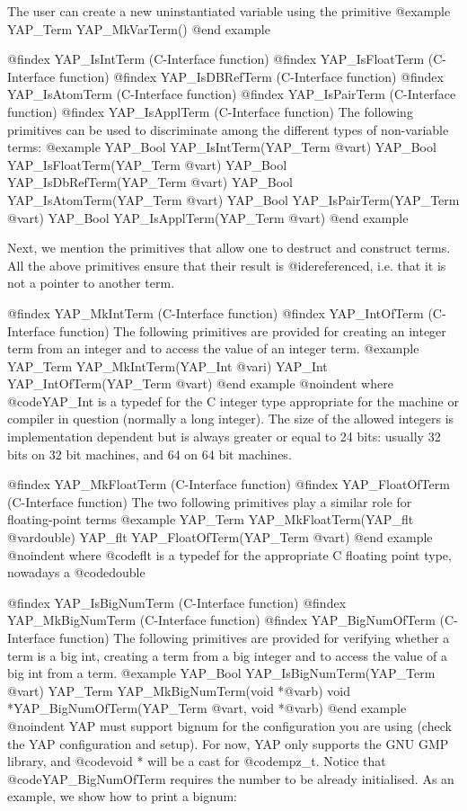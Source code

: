 {{{{{{{{{The user can create a new uninstantiated variable using the primitive
@example
      YAP_Term  YAP_MkVarTerm()
@end example


@findex YAP_IsIntTerm (C-Interface function)
@findex YAP_IsFloatTerm (C-Interface function)
@findex YAP_IsDBRefTerm (C-Interface function)
@findex YAP_IsAtomTerm (C-Interface function)
@findex YAP_IsPairTerm (C-Interface function)
@findex YAP_IsApplTerm (C-Interface function)
The following primitives can be used to discriminate among the different types
of non-variable terms:
@example
      YAP_Bool YAP_IsIntTerm(YAP_Term @var{t})
      YAP_Bool YAP_IsFloatTerm(YAP_Term @var{t})
      YAP_Bool YAP_IsDbRefTerm(YAP_Term @var{t})
      YAP_Bool YAP_IsAtomTerm(YAP_Term @var{t})
      YAP_Bool YAP_IsPairTerm(YAP_Term @var{t})
      YAP_Bool YAP_IsApplTerm(YAP_Term @var{t})
@end example

Next, we mention the primitives that allow one to destruct and construct
terms. All the above primitives ensure that their result is
@i{dereferenced}, i.e. that it is not a pointer to another term.

@findex YAP_MkIntTerm (C-Interface function)
@findex YAP_IntOfTerm (C-Interface function)
The following primitives are provided for creating an integer term from an
integer and to access the value of an integer term.
@example
      YAP_Term YAP_MkIntTerm(YAP_Int  @var{i})
      YAP_Int  YAP_IntOfTerm(YAP_Term @var{t})
@end example
@noindent
where @code{YAP_Int} is a typedef for the C integer type appropriate for
the machine or compiler in question (normally a long integer). The size
of the allowed integers is implementation dependent but is always
greater or equal to 24 bits: usually 32 bits on 32 bit machines, and 64
on 64 bit machines.

@findex YAP_MkFloatTerm (C-Interface function)
@findex YAP_FloatOfTerm (C-Interface function)
The two following primitives play a similar role for floating-point terms
@example
      YAP_Term YAP_MkFloatTerm(YAP_flt @var{double})
      YAP_flt  YAP_FloatOfTerm(YAP_Term @var{t})
@end example
@noindent
where @code{flt} is a typedef for the appropriate C floating point type,
nowadays a @code{double}

@findex YAP_IsBigNumTerm (C-Interface function)
@findex YAP_MkBigNumTerm (C-Interface function)
@findex YAP_BigNumOfTerm (C-Interface function)
The following primitives are provided for verifying whether a term is
a big int, creating a term from a big integer and to access the value
of a big int from a term.
@example
      YAP_Bool YAP_IsBigNumTerm(YAP_Term @var{t})
      YAP_Term YAP_MkBigNumTerm(void  *@var{b})
      void *YAP_BigNumOfTerm(YAP_Term @var{t}, void *@var{b})
@end example
@noindent
YAP must support bignum for the configuration you are using (check the
YAP configuration and setup). For now, YAP only supports the GNU GMP
library, and @code{void *} will be a cast for @code{mpz_t}. Notice
that @code{YAP_BigNumOfTerm} requires the number to be already
initialised. As an example, we show how to print a bignum:

}}}}}}}}}
